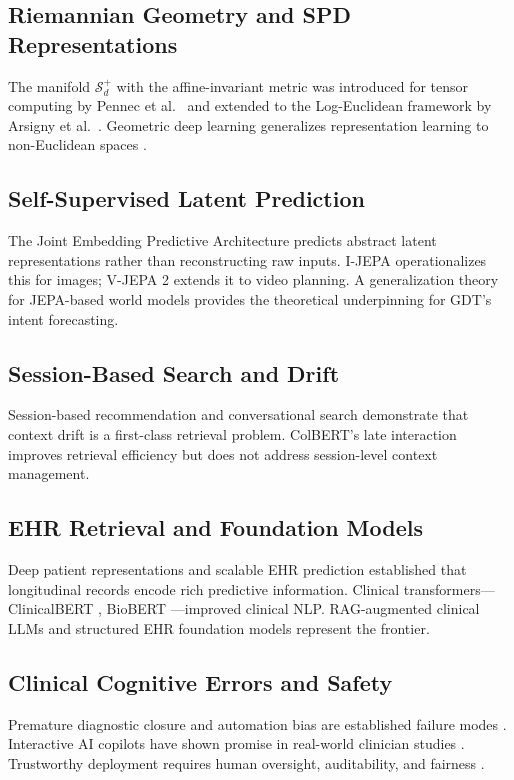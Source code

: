 \documentclass[11pt,a4paper]{article}
\begin{document}
\subsection{Riemannian Geometry and SPD Representations}
The manifold $\mathcal{S}_d^+$ with the affine-invariant metric was introduced for tensor computing by Pennec et al.\ \cite{pennec2006_spd} and extended to the Log-Euclidean framework by Arsigny et al.\ \cite{arsigny2007_logeuclidean}. Geometric deep learning generalizes representation learning to non-Euclidean spaces \cite{bronstein2017}.

\subsection{Self-Supervised Latent Prediction}
The Joint Embedding Predictive Architecture \cite{lecun2022} predicts abstract latent representations rather than reconstructing raw inputs. I-JEPA \cite{assran2023_ijepa} operationalizes this for images; V-JEPA 2 \cite{assran2025_vjepa2} extends it to video planning. A generalization theory for JEPA-based world models \cite{cui2026_jepa_theory} provides the theoretical underpinning for GDT's intent forecasting.

\subsection{Session-Based Search and Drift}
Session-based recommendation \cite{hidasi2015,wu2019_session} and conversational search \cite{iyyer20,zamani20} demonstrate that context drift is a first-class retrieval problem. ColBERT's late interaction \cite{khattab20} improves retrieval efficiency but does not address session-level context management.

\subsection{EHR Retrieval and Foundation Models}
Deep patient representations \cite{miotto2016} and scalable EHR prediction \cite{rajkomar2018} established that longitudinal records encode rich predictive information. Clinical transformers---ClinicalBERT \cite{huang2019_clinicalbert}, BioBERT \cite{lee2020_biobert}---improved clinical NLP. RAG-augmented clinical LLMs \cite{liu2025_rag_biomed} and structured EHR foundation models \cite{guo2026_porter,shurrab2026_ehrragp} represent the frontier.

\subsection{Clinical Cognitive Errors and Safety}
Premature diagnostic closure and automation bias are established failure modes \cite{croskerry2003,goddard2012}. Interactive AI copilots have shown promise in real-world clinician studies \cite{zhu2026_aicare}. Trustworthy deployment requires human oversight, auditability, and fairness \cite{lekadir25}.
\end{document}
